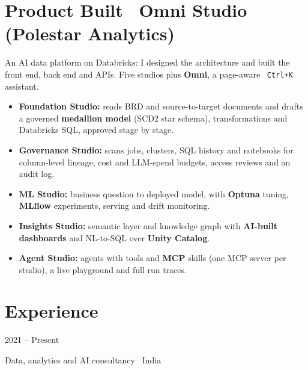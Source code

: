 \documentclass[10pt,a4paper]{article}
\newcommand{\role}[2]{%
  \vspace{3pt}{\color{navy}\large #1}\hfill{\color{muted}\small #2}\par\vspace{1pt}}
\begin{document}
\section{Product Built \textendash\ Omni Studio (Polestar Analytics)}
{\small\color{muted}An AI data platform on Databricks: I designed the architecture and built the front end, back end and APIs. Five studios plus \textbf{Omni}, a page-aware \faKeyboard\ \texttt{Ctrl+K} assistant.}
\begin{itemize}
  \item \textbf{Foundation Studio:} reads BRD and source-to-target documents and drafts a governed \textbf{medallion model} (SCD2 star schema), transformations and Databricks SQL, approved stage by stage.
  \item \textbf{Governance Studio:} scans jobs, clusters, SQL history and notebooks for column-level lineage, cost and LLM-spend budgets, access reviews and an audit log.
  \item \textbf{ML Studio:} business question to deployed model, with \textbf{Optuna} tuning, \textbf{MLflow} experiments, serving and drift monitoring.
  \item \textbf{Insights Studio:} semantic layer and knowledge graph with \textbf{AI-built dashboards} and NL-to-SQL over \textbf{Unity Catalog}.
  \item \textbf{Agent Studio:} agents with tools and \textbf{MCP} skills (one MCP server per studio), a live playground and full run traces.
\end{itemize}

\section{Experience}

\role{Polestar Analytics}{2021 -- Present}
{\color{muted}\small Data, analytics and AI consultancy \textbar\ India}\par
\end{document}
